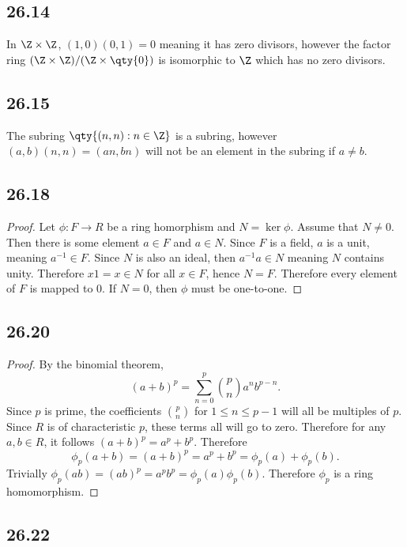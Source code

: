 \documentclass[12pt,titlepage]{extarticle}
\begin{document}
\subsection*{26.14}
In $\Z \times \Z$, $(1,0)(0,1) = 0$ meaning it has zero divisors, however the factor ring $(\Z \times \Z) / (\Z \times \qty{0})$ is isomorphic to $\Z$ which has no zero divisors.

\subsection*{26.15}
The subring $\qty{(n, n) : n \in \Z}$ is a subring, however $(a,b)(n,n) = (an, bn)$ will not be an element in the subring if $a \neq b$.

\subsection*{26.18}
\begin{proof}
    Let $\phi : F \to R$ be a ring homorphism and $N = \ker \phi$. Assume that $N \neq \qty{0}$. Then there is some element $a \in F$ and $a \in N$. Since $F$ is a field, $a$ is a unit, meaning $a^{-1} \in F$. Since $N$ is also an ideal, then $a^{-1} a \in N$ meaning $N$ contains unity. Therefore $x 1 = x \in N$ for all $x \in F$, hence $N = F$. Therefore every element of $F$ is mapped to $0$. If $N = \qty{0}$, then $\phi$ must be one-to-one.
\end{proof}

\subsection*{26.20}
\begin{proof}
    By the binomial theorem,
    \[
        (a+b)^p = \sum_{n=0}^p \binom{p}{n} a^{n} b^{p-n}
    .\]
    Since $p$ is prime, the coefficients $\binom{p}{n}$ for $1 \leq n \leq p - 1$ will all be multiples of $p$. Since $R$ is of characteristic $p$, these terms all will go to zero. Therefore for any $a,b \in R$, it follows $(a+b)^p = a^p + b^p$. Therefore 
    \[
        \phi_p(a+b) = (a+b)^p = a^p + b^p = \phi_p(a) + \phi_p(b)
    .\]
    Trivially $\phi_p(ab) = (ab)^p = a^p b^p = \phi_p(a) \phi_p(b)$. Therefore $\phi_p$ is a ring homomorphism.
\end{proof}

\subsection*{26.22}
\end{document}
